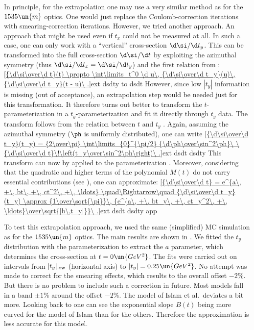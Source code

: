 In principle, for the extrapolation one may use a very similar method as for the $1535\un{m}$ optics. One would just replace the Coulomb-correction iterations with smearing-correction iterations. However, we tried another approach. An approach that might be used even if $t_x$ could not be measured at all. In such a case, one can only work with a ``vertical'' cross-section $\d\si/\d t_y$. This can be transformed into the full cross-section $\d\si/\d t$ by exploiting the azimuthal symmetry (thus $\d\si/\d t_x = \d\si/\d t_y$) and the first relation from :
\eqref{{\d\si\over\d t}(t) \propto \int\limits_t^0 \d u\, {\d\si\over\d t_y}(u)\, {\d\si\over\d t_y}(t - u)\ .}{ext dsdty to dsdt}
However, since low $|t_y|$ information is missing (out of acceptance), an extrapolation step would be needed just for this transformation. It therefore turns out better to transform the $t$-parameterization  in a $t_y$-parameterization and fit it directly through $t_y$ data. The transform follows from the relation between $t$ and $t_y$ . Again, assuming the azimuthal symmetry ($\ph$ is uniformly distributed), one can write
\eqref{{\d\si\over\d t_y}(t_y) = {2\over\pi} \int\limits_{0}^{\pi/2} {\d\ph\over\sin^2\ph}\ \ {\d\si\over\d t}\!\left(t_y\over\sin^2\ph\right)\ .}{ext dsdt dsdty}
This transform can now by applied to the parameterization . Moreover, considering that the quadratic and higher terms of the polynomial $M(t)$ do not carry essential contributions (see ), one can approximate:
\eqref{{\d\si\over\d t} = e^{a\, +\, bt\, +\, ct^2\, +\, \ldots} \quad\Rightarrow\quad {\d\si\over\d t_y}(t_y) \approx {1\over\sqrt{\pi}}\, {e^{a\, +\, bt_y\, +\, ct_y^2\, +\, \ldots}\over\sqrt{|b\,t_y|}}\ .}{ext dsdt dsdty app}

To test this extrapolation approach, we used the same (simplified) MC simulation as for the $1535\un{m}$ optics. The main results are shown in . We fitted the $t_y$ distribution with the parameterization  to extract the $a$ parameter, which determines the cross-section at $t=0\un{GeV^2}$. The fits were carried out on intervals from $|t_y|_{\rm low}$ (horizontal axis) to $|t_y| = 0.25\un{GeV^2}$. No attempt was made to correct for the smearing effects, which results to the overall offset $-2\percent$. But there is no problem to include such a correction in future. Most models fall in a band $\pm 1\percent$ around the offset $-2\percent$. The model of Islam et al.~deviates a bit more. Looking back to  one can see the exponential slope $B(t)$ being more curved for the model of Islam than for the others. Therefore the approximation  is less accurate for this model.


